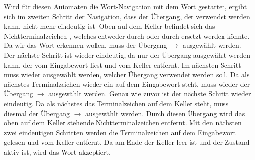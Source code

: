 Wird für diesen Automaten die Wort-Navigation mit dem Wort 
ge\-star\-tet, ergibt sich im zweiten Schritt der Navigation, dass der Übergang,
der verwendet werden kann, nicht mehr eindeutig ist. Oben auf dem Keller befindet
sich das Nichtterminalzeichen , welches entweder durch
\TerminalSymbol{$\epsilon$} oder durch
 ersetzt werden könnte. Da wir
das Wort  erkennen wollen, muss der Übergang  $\to$
 ausgewählt werden. Der
nächste Schritt ist wieder eindeutig, da nur der Übergang ausgewählt werden kann,
der  vom Eingabewort liest und  vom Keller
entfernt. Im nächsten Schritt muss wieder ausgewählt werden, welcher Übergang
verwendet werden soll. Da als nächstes Terminalzeichen wieder ein
 auf dem Eingabewort steht, muss wieder der Übergang 
$\to$  ausgewählt werden.
Genau wie zuvor ist der nächste Schritt wieder eindeutig. Da als nächstes das
Terminalzeichen  auf dem Keller steht, muss diesmal der
Übergang  $\to$ \TerminalSymbol{$\epsilon$} ausgewählt werden.
Durch diesen Übergang wird das oben auf dem Keller stehende Nichtterminalzeichen
 entfernt. Mit den nächsten zwei eindeutigen Schritten werden die
Terminalzeichen  auf dem Eingabewort gelesen und vom Keller
entfernt. Da am Ende der Keller leer ist und der Zustand  aktiv ist,
wird das Wort akzeptiert.